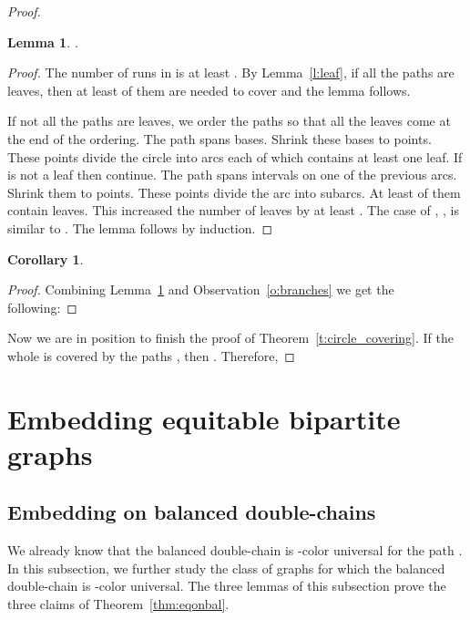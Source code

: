 \documentclass[12pt]{article}
\newtheorem{lemma}[theorem]{Lemma}
\newtheorem{corollary}[theorem]{Corollary}
\begin{document}
\begin{proof}
\begin{lemma}\label{l:leaves}
.
\end{lemma}

\begin{proof}
The number of runs in  is at least . By Lemma~\ref{l:leaf}, if all the paths  are leaves, then at least  of them are needed to cover  and the lemma follows. 

If not all the paths are leaves, we order the paths so that all the leaves come at the end of the ordering. 
The path  spans  bases. Shrink these bases to points. These points divide the circle into  arcs each of which contains at least one leaf. If  is not a leaf then continue. The path  spans  intervals on one of the previous arcs. Shrink them to points. These points divide the arc into  subarcs. At least  of them contain leaves. This increased the number of leaves by at least . The case of , , is similar to . The lemma follows by induction.
\end{proof}





\begin{corollary} 

\end{corollary}

\begin{proof}
Combining Lemma~\ref{l:leaves} and Observation~\ref{o:branches} we get the following:

\end{proof}
\bigskip

Now we are in position to finish the proof of Theorem~\ref{t:circle_covering}.
If the whole  is covered by the paths , then . Therefore,


\end{proof}






\section{Embedding equitable bipartite graphs}
\label{sec:emb}
\subsection{Embedding on balanced double-chains}
We already know that the balanced double-chain is -color universal for the path . 
In this subsection, we further study the class of graphs for which the balanced double-chain 
is -color universal. The three lemmas of this subsection prove the three claims of 
Theorem~\ref{thm:eqonbal}.
\end{document}
